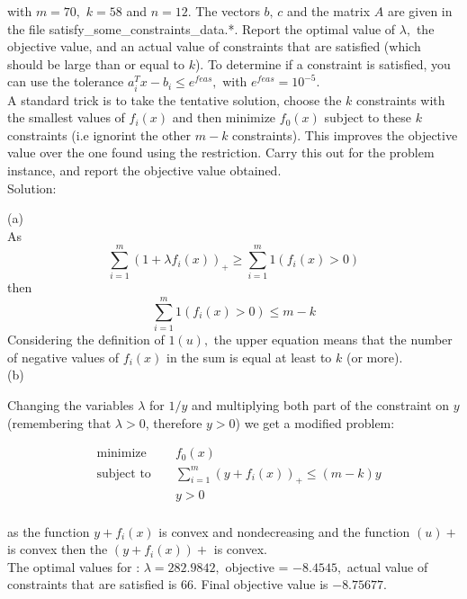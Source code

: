 \documentclass{article}
\begin{document}
with $m = 70,$ $k = 58$ and $n = 12.$ The vectors 
$b, \, c$ and the matrix $A$ are given in the file satisfy\_some\_constraints\_data.*. Report the optimal value of $\lambda,$ the objective value, and an actual value of constraints that are satisfied (which should be large than or equal to $k$). To determine if a constraint is satisfied, you can use the tolerance 
$a_i^T x - b_i \leq e^{feas},$ with $e^{feas} = 10^{-5}.$ \\
A standard trick is to take the tentative solution, choose the $k$ constraints with the smallest values of 
$f_i(x)$ and then minimize $f_0(x)$ subject to these $k$ constraints (i.e ignorint the other $m - k$ constraints). This improves the objective value over the one found using the restriction. Carry this out for the problem instance, and report the objective value obtained. \\

Solution:

(a) \\
As
$$
\sum_{i = 1}^{m} (1 + \lambda f_i(x))_+ \geq 
\sum_{i = 1}^{m} 1(f_i(x)> 0)
$$
then
$$
\sum_{i = 1}^{m} 1(f_i(x)> 0) \leq m - k
$$
Considering the definition of $1(u),$ the upper equation means that the number of negative values of $f_i(x)$ in the sum is equal at least to $k$ (or more). \\

(b)

Changing the variables $\lambda $ for $1/y$ and multiplying both part of the constraint on $y$ (remembering that $\lambda > 0$, therefore $y > 0$) we get a modified problem:

\begin{align*}
&\text{minimize } && f_0(x) \\
&\text{subject to } &&\sum_{i = 1}^{m} (y + f_i(x))_+ \leq (m - k) y\\
& &&y > 0\\
\end{align*} 

as the function $y + f_i(x)$ is convex and nondecreasing and the function $(u)+$ is convex then the $(y + f_i(x))+$ is convex. \\

The optimal values for : $\lambda = 282.9842, $ objective = $-8.4545, $ actual value of constraints that are satisfied is 66. Final objective value is $-8.75677.$
\end{document}
